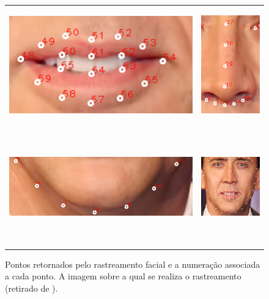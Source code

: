 \begin{figure}
\begin{tabular}{cc}
\includegraphics[width=0.4\linewidth, height=5cm]{figs/nick-marked-mouth.png} &
\includegraphics[width=0.4\linewidth, height=5cm]{figs/nick-marked-nose.png} \\
\includegraphics[width=0.4\linewidth, height=5cm]{figs/nick-marked-queixo.png} &
\includegraphics[width=0.4\linewidth, height=5cm]{figs/nick-marked.png}
\end{tabular}
\caption{Pontos retornados pelo rastreamento facial e a numeração associada a cada ponto. A imagem sobre a qual se realiza o rastreamento (retirado de \cite{nicolas}).}
\label{fig:tracked-facial-points}
\end{figure}


